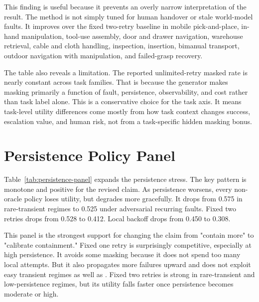 \begin{table}[t]
\centering
\caption{Task-level utility gaps. \method beats fixed two retries for every task family while unlimited retry keeps a high masked unsafe rate.}
\label{tab:task-gaps}
\resizebox{\linewidth}{!}{}
\end{table}

This finding is useful because it prevents an overly narrow interpretation of the result. The method is not simply tuned for human handover or stale world-model faults. It improves over the fixed two-retry baseline in mobile pick-and-place, in-hand manipulation, tool-use assembly, door and drawer navigation, warehouse retrieval, cable and cloth handling, inspection, insertion, bimanual transport, outdoor navigation with manipulation, and failed-grasp recovery.

The table also reveals a limitation. The reported unlimited-retry masked rate is nearly constant across task families. That is because the generator makes masking primarily a function of fault, persistence, observability, and cost rather than task label alone. This is a conservative choice for the task axis. It means task-level utility differences come mostly from how task context changes success, escalation value, and human risk, not from a task-specific hidden masking bonus.

\section{Persistence Policy Panel}

Table~\ref{tab:persistence-panel} expands the persistence stress. The key pattern is monotone and positive for the revised claim. As persistence worsens, every non-oracle policy loses utility, but \method degrades more gracefully. It drops from 0.575 in rare-transient regimes to 0.525 under adversarial recurring faults. Fixed two retries drops from 0.528 to 0.412. Local backoff drops from 0.450 to 0.308.

\begin{table}[t]
\centering
\caption{Persistence policy panel. Risk calibration remains the best non-oracle policy as persistence rises.}
\label{tab:persistence-panel}
\resizebox{\linewidth}{!}{}
\end{table}

This panel is the strongest support for changing the claim from "contain more" to "calibrate containment." Fixed one retry is surprisingly competitive, especially at high persistence. It avoids some masking because it does not spend too many local attempts. But it also propagates more failures upward and does not exploit easy transient regimes as well as \method. Fixed two retries is strong in rare-transient and low-persistence regimes, but its utility falls faster once persistence becomes moderate or high.

